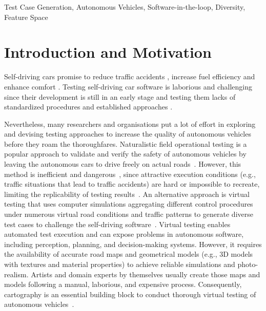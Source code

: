 \documentclass[conference]{IEEEtran}
\begin{document}
 \begin{IEEEkeywords}
Test Case Generation, Autonomous Vehicles, Software-in-the-loop, Diversity, Feature Space
 \end{IEEEkeywords}

\section{Introduction and Motivation}
Self-driving cars promise to reduce traffic accidents \cite{peden2016status}, increase fuel efficiency \cite{zamzuri2016current} and enhance comfort %
 \cite{harper2016estimating}.
Testing self-driving car software is laborious and challenging since their development is still in an early stage and testing them lacks of standardized procedures and established approaches \cite{gambi2019generating}.\par

Nevertheless, many researchers and organisations put a lot of effort in exploring and devising testing approaches to increase the quality of autonomous vehicles before they roam the thoroughfares.
%
Naturalistic field operational testing is a popular approach to validate and verify the safety of autonomous vehicles by leaving the autonomous cars to drive freely on actual roads~\cite{kalra2016driving}. However, this method is inefficient and dangerous~\cite{gambi2019generating}, since attractive execution conditions (e.g.,  traffic situations that lead to traffic accidents) are hard or impossible to recreate, limiting the replicability of testing results~\cite{hasenau2019virtual}. An alternative approach is virtual testing that uses computer simulations aggregating different control procedures under numerous virtual road conditions and traffic patterns to generate diverse test cases to challenge the self-driving software~\cite{hasenau2019virtual}. Virtual testing enables automated test execution and can expose problems in autonomous software, including perception, planning, and decision-making systems. However, it requires the availability of accurate road maps and geometrical models (e.g., 3D models with textures and material properties) to achieve reliable simulations and photo-realism. Artists and domain experts by themselves usually create those maps and models following a manual, laborious, and expensive process.
%
Consequently, cartography is an essential building block to conduct thorough virtual testing of autonomous vehicles~\cite{althoff2018automatic}. 
\end{document}
